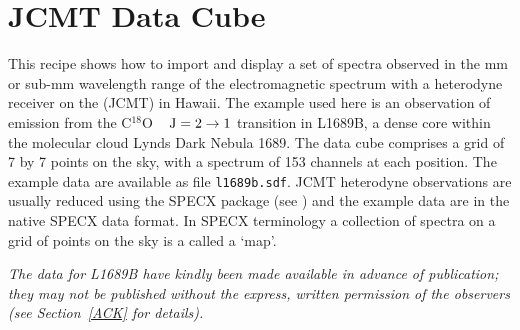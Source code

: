 \documentclass[twoside,11pt]{starlink}
\begin{document}
\newpage
\section{\label{JCMT}JCMT Data Cube}

This recipe shows how to import and display a set of spectra observed
in the mm or sub-mm wavelength range of the electromagnetic spectrum
with a heterodyne receiver on the  (JCMT) in Hawaii.
The example used here is an observation of emission from the C$^{18}$O ~
${\rm J} = 2 \rightarrow 1$ transition in L1689B, a dense core within
the molecular cloud Lynds Dark Nebula 1689.  The data cube comprises a
grid of 7 by 7 points on the sky, with a spectrum of 153 channels at each
position.  The example data are available as file \texttt{l1689b.sdf}.
JCMT heterodyne observations are usually reduced using the SPECX package
(see \cite{SUN17}) and the example data are in the
native SPECX data format.  In SPECX terminology a collection of spectra
on a grid of points on the sky is a called a `map'.

\textit{The data for L1689B have kindly been made available in advance of
publication; they may not be published without the express, written
permission of the observers (see Section~\ref{ACK} for details).}
\end{document}
